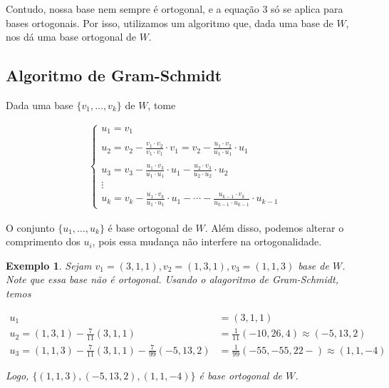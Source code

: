 \documentclass{article}
\newtheorem*{example}{Exemplo}
\begin{document}
\par\vspace{0.3cm} Contudo, nossa base nem sempre é ortogonal, e a equação 3 só se aplica para bases ortogonais. Por isso, utilizamos um algoritmo que, dada uma base de $W$, nos dá uma base ortogonal de $W$.

\subsection{Algoritmo de Gram-Schmidt}
\hspace{12pt} Dada uma base $\{v_1, \dots, v_k\}$ de $W$, tome

\begin{align*}
\begin{cases}
u_1 = v_1 \\
\\
u_2 = v_2 - \displaystyle{\frac{v_1\cdot v_2}{v_1\cdot v_1}\cdot v_1 = v_2 - \frac{u_1\cdot v_2}{u_1\cdot u_1}\cdot u_1}\\
\\
u_3 = v_3 - \displaystyle{\frac{u_1\cdot v_3}{u_1\cdot u_1}\cdot u_1 - \frac{u_2\cdot v_3}{u_2\cdot u_2}\cdot u_2}\\
\vdots\\
u_k = v_k - \displaystyle{\frac{u_1\cdot v_k}{u_1\cdot u_1}\cdot u_1 - \cdots -  \frac{u_{k-1}\cdot v_k}{u_{k-1}\cdot u_{k-1}}\cdot u_{k-1}}	
\end{cases}
\end{align*}

\par\vspace{0.3cm} O conjunto $\{u_1, \dots, u_k\}$ é base ortogonal de $W$. Além disso, podemos alterar o comprimento dos $u_i$, pois essa mudança não interfere na ortogonalidade.

\begin{example}
	Sejam $v_1 = (3,1,1), v_2 = (1,3,1), v_3 = (1,1,3)$ base de $W$. Note que essa base não é ortogonal. Usando o alagoritmo de Gram-Schmidt, temos
	
	\begin{align*}
	u_1 &= (3,1,1) \\
	u_2 = (1,3,1) - \frac{7}{11}(3,1,1) &= \frac{1}{11}(-10,26,4) \approx (-5,13,2)\\
	u_3 = (1,1,3) - \frac{7}{11}(3,1,1) - \frac{7}{99}(-5,13,2) &= \frac{1}{99}(-55,-55,22-) \approx (1,1,-4)
	\end{align*}
	
	\par\vspace{0.3cm} Logo, $\{(1,1,3), (-5, 13, 2), (1, 1, -4)\}$ é base ortogonal de $W$.
	
\end{example}
\end{document}

